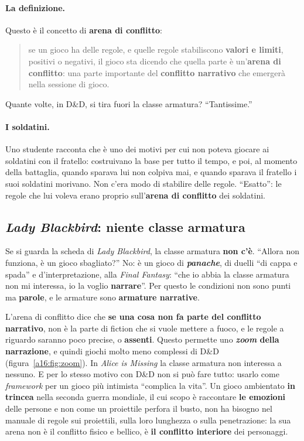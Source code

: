 \paragraph{La definizione.} Questo è il concetto di \textbf{arena di conflitto}:
\begin{quote}
se un gioco ha delle regole, e quelle regole stabiliscono \textbf{valori e limiti}, positivi o
negativi, il gioco sta dicendo che quella parte è un'\textbf{arena di conflitto}: una parte
importante del \textbf{conflitto narrativo} che emergerà nella sessione di gioco.
\end{quote}
Quante volte, in D\&D, si tira fuori la classe armatura? ``Tantissime.''

\paragraph{I soldatini.} Uno studente racconta che è uno dei motivi per cui non poteva giocare ai
soldatini con il fratello: costruivano la base per tutto il tempo, e poi, al momento della
battaglia, quando sparava lui non colpiva mai, e quando sparava il fratello i suoi soldatini
morivano. Non c'era modo di stabilire delle regole. ``Esatto'': le regole che lui voleva erano
proprio sull'\textbf{arena di conflitto} dei soldatini.

\subsection{\emph{Lady Blackbird}: niente classe armatura}

Se si guarda la scheda di \emph{Lady Blackbird}, la classe armatura \textbf{non c'è}. ``Allora non
funziona, è un gioco sbagliato?'' No: è un gioco di \textbf{\emph{panache}}, di duelli ``di cappa e
spada'' e d'interpretazione, alla \emph{Final Fantasy}: ``che io abbia la classe armatura non mi
interessa, io la voglio \textbf{narrare}''. Per questo le condizioni non sono punti ma
\textbf{parole}, e le armature sono \textbf{armature narrative}.

L'arena di conflitto dice che \textbf{se una cosa non fa parte del conflitto narrativo}, non è la
parte di fiction che si vuole mettere a fuoco, e le regole a riguardo saranno poco precise, o
\textbf{assenti}. Questo permette uno \textbf{\emph{zoom} della narrazione}, e quindi giochi molto
meno complessi di D\&D (figura~\ref{a16:fig:zoom}). In \emph{Alice is Missing} la classe armatura
non interessa a nessuno. E per lo stesso motivo con D\&D non si può fare tutto: usarlo come
\emph{framework} per un gioco più intimista ``complica la vita''. Un gioco ambientato \textbf{in
trincea} nella seconda guerra mondiale, il cui scopo è raccontare \textbf{le emozioni} delle
persone e non come un proiettile perfora il busto, non ha bisogno nel manuale di regole sui
proiettili, sulla loro lunghezza o sulla penetrazione: la sua arena non è il conflitto fisico e
bellico, è \textbf{il conflitto interiore} dei personaggi.

